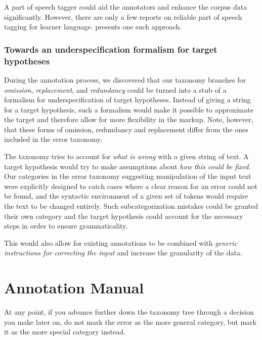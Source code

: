 \documentclass[12pt]{article}
\begin{document}
A part of speech tagger could aid the annotators and enhance the corpus data
significantly. However, there are only a few reports on reliable part of speech
tagging for learner language. \cite{ludeling} presents one such approach.

\subsubsection{Towards an underspecification formalism for target hypotheses}

During the annotation process, we discovered that our taxonomy branches for
\textit{omission}, \textit{replacement}, and \textit{redundancy} could be turned
into a stub of a formalism for underspecification of target hypotheses. Instead
of giving a string for a target hypothesis, such a formalism would make it
possible to approximate the target and therefore allow for more flexibility in
the markup. Note, however, that these forms of omission, redundancy and
replacement differ from the ones included in the error taxonomy.

The taxonomy tries to account for \textit{what is wrong} with a given string of
text. A target hypothesis would try to make assumptions about \textit{how this
could be fixed}. Our categories in the error taxonomy suggesting manipulation of
the input text were explicitly designed to catch cases where a clear reason for
an error could not be found, and the syntactic environment of a given set of
tokens would require the text to be changed entirely. Such subcategorization
mistakes could be granted their own category and the target hypothesis could
account for the necessary steps in order to ensure grammaticality.

This would also allow for existing annotations to be combined with
\textit{generic instructions for correcting the input} and increase the
granularity of the data.

\appendix

\section{Annotation Manual}
  At any point, if you advance further down the taxonomy tree through a decision
  you make later on, do not mark the error as the more general category, but
  mark it as the more special category instead.
\end{document}
